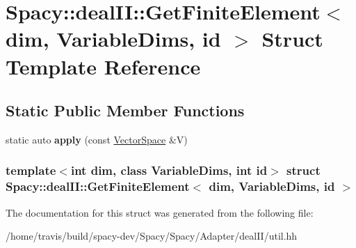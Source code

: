 \hypertarget{structSpacy_1_1dealII_1_1GetFiniteElement}{\section{\-Spacy\-:\-:deal\-I\-I\-:\-:\-Get\-Finite\-Element$<$ dim, \-Variable\-Dims, id $>$ \-Struct \-Template \-Reference}
\label{structSpacy_1_1dealII_1_1GetFiniteElement}
}
\subsection*{\-Static \-Public \-Member \-Functions}
\begin{DoxyCompactItemize}
\item 
\hypertarget{structSpacy_1_1dealII_1_1GetFiniteElement_af48bb4def16a6ca29f4f72decfa08077}{static auto {\bfseries apply} (const \hyperlink{classSpacy_1_1VectorSpace}{\-Vector\-Space} \&\-V)}\label{structSpacy_1_1dealII_1_1GetFiniteElement_af48bb4def16a6ca29f4f72decfa08077}

\end{DoxyCompactItemize}
\subsubsection*{template$<$int dim, class Variable\-Dims, int id$>$ struct Spacy\-::deal\-I\-I\-::\-Get\-Finite\-Element$<$ dim, Variable\-Dims, id $>$}



\-The documentation for this struct was generated from the following file\-:\begin{DoxyCompactItemize}
\item 
/home/travis/build/spacy-\/dev/\-Spacy/\-Spacy/\-Adapter/deal\-I\-I/util.\-hh\end{DoxyCompactItemize}
